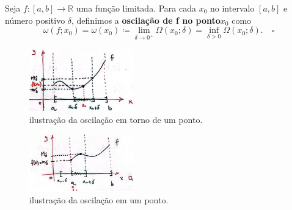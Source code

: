 \documentclass[../analysisII_notes.tex]{subfiles}
\begin{document}
\begin{def*}
	Seja \(f:[a, b]\rightarrow \mathbb{R}\) uma função limitada. Para cada \(x_{0}\) no intervalo \([a, b]\) e número positivo \(\delta \), definimos a \textbf{oscilação de f no ponto}\(x_{0}\) como
	\[
		\omega (f; x_{0})=\omega (x_{0})\coloneqq \lim_{\delta \to 0^{+}}\Omega (x_{0}; \delta )=\inf_{\delta > 0}\Omega (x_{0};\delta ). \quad \square
	\]
\end{def*}

\begin{figure}[H]
	\begin{center}
		\includegraphics[height=0.4\textheight, width=0.4\textwidth, keepaspectratio]{./Images/around_oscilation_11.png}
	\end{center}
	\caption{ilustração da oscilação em torno de um ponto.}
	\label{arnd11}
\end{figure}
\begin{figure}[H]
	\begin{center}
		\includegraphics[height=0.4\textheight, width=0.4\textwidth, keepaspectratio]{./Images/point_oscilation_11.png}
	\end{center}
	\caption{ilustração da oscilação em um ponto.}
	\label{at11}
\end{figure}
\end{document}
